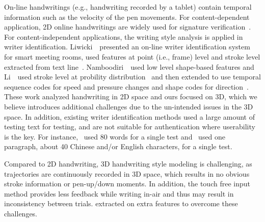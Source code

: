 On-line handwritings (e.g., handwriting recorded by a tablet) contain temporal information such as the velocity of the pen movements. For content-dependent application, 2D online handwritings are widely used for signature verification~\cite{Guru:PAM09}. For content-independent applications, the writing style analysis is applied in writer identification. Liwicki~\etal ~presented an on-line writer identification system for smart meeting rooms, used features at point (i.e., frame) level and stroke level extracted from text line~\cite{Liwicki2006:onlineSmartMeeting}.
Namboodiri~\etal ~used low level shape-based features and Li~\etal ~used stroke level at probility distribution~\cite{Li2007:StrokeProbabilityDistribution} and then extended to use temporal sequence codes for speed and pressure changes and shape codes for direction~\cite{conf/icdar/LiT09}. These work analyzed handwriting in 2D space and ours focused on 3D, which we believe introduces additional challenges due to the un-intended issues in the 3D space. In addition, existing writer identification methods used a large amount of testing text for testing, and are not suitable for authentication where userability is the key. For instance,~\cite{Liwicki2006:onlineSmartMeeting} used 80 words for a single test and~\cite{conf/icdar/LiT09} used one paragraph, about 40 Chinese and/or English characters, for a single test.
  
Compared to 2D handwriting, 3D handwriting style modeling is challenging, as trajectories are continuously recorded in 3D space, which results in no obvious stroke information or pen-up/down moments. In addition, the touch free input method provides less feedback while writing in-air and thus may result in inconsistency between trials. \CiT extracted on extra features to overcome these challenges.




